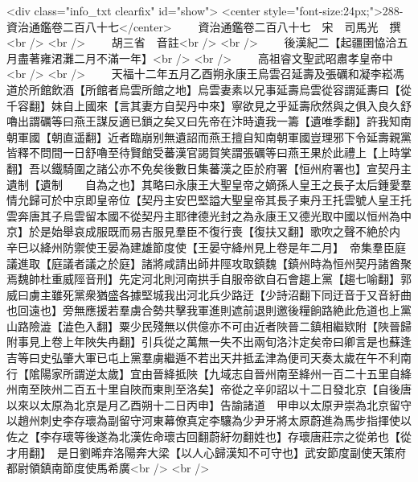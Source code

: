 <div class="info_txt clearfix" id="show">
<center style="font-size:24px;">288-資治通鑑卷二百八十七</center>
  　　資治通鑑卷二百八十七　宋　司馬光　撰<br />
<br />
　　胡三省　音註<br />
<br />
　　後漢紀二【起疆圉恊洽五月盡著雍涒灘二月不滿一年】<br />
<br />
　　高祖睿文聖武昭肅孝皇帝中<br />
<br />
　　天福十二年五月乙酉朔永康王烏雲召延壽及張礪和凝李崧馮道於所館飲酒【所館者烏雲所館之地】烏雲妻素以兄事延壽烏雲從容謂延夀曰【從千容翻】妹自上國來【言其妻方自契丹中來】寧欲見之乎延壽欣然與之俱入良久舒嚕出謂礪等曰燕王謀反適已鎖之矣又曰先帝在汴時遺我一籌【遺唯季翻】許我知南朝軍國【朝直遥翻】近者臨崩别無遺詔而燕王擅自知南朝軍國豈理邪下令延壽親黨皆釋不問間一日舒嚕至待賢館受蕃漢官謁賀笑謂張礪等曰燕王果於此禮上【上時掌翻】吾以鐵騎圍之諸公亦不免矣後數日集蕃漢之臣於府署【恒州府署也】宣契丹主遺制【遺制　　自為之也】其略曰永康王大聖皇帝之嫡孫人皇王之長子太后鍾愛羣情允歸可於中京即皇帝位【契丹主安巴堅謚大聖皇帝其長子東丹王托雲號人皇王托雲奔唐其子烏雲留本國不從契丹主耶律德光封之為永康王又德光取中國以恒州為中京】於是始舉哀成服既而易吉服見羣臣不復行喪【復扶又翻】歌吹之聲不絶於内　辛巳以絳州防禦使王晏為建雄節度使【王晏守絳州見上卷是年二月】　帝集羣臣庭議進取【庭議者議之於庭】諸將咸請出師井陘攻取鎮魏【鎮州時為恒州契丹諸酋聚焉魏帥杜重威陘音刑】先定河北則河南拱手自服帝欲自石會趨上黨【趨七喻翻】郭威曰虜主雖死黨衆猶盛各據堅城我出河北兵少路迂【少詩沼翻下同迂音于又音紆曲也回遠也】旁無應援若羣虜合勢共擊我軍進則遮前退則邀後糧餉路絶此危道也上黨山路險澁【澁色入翻】粟少民殘無以供億亦不可由近者陜晉二鎮相繼欵附【陜晉歸附事見上卷上年陜失冉翻】引兵從之萬無一失不出兩旬洛汴定矣帝曰卿言是也蘇逢吉等曰史弘肇大軍已屯上黨羣虜繼遁不若出天井抵孟津為便司天奏太歲在午不利南行【隂陽家所謂逆太歲】宜由晉絳抵陜【九域志自晉州南至絳州一百二十五里自絳州南至陜州二百五十里自陜而東則至洛矣】帝從之辛卯詔以十二日發北京【自後唐以來以太原為北京是月乙酉朔十二日丙申】告諭諸道　甲申以太原尹崇為北京留守以趙州刺史李存瓌為副留守河東幕僚真定李驤為少尹牙將太原蔚進為馬步指揮使以佐之【李存瓌等後遂為北漢佐命瓌古回翻蔚紆勿翻姓也】存瓌唐莊宗之從弟也【從才用翻】　是日劉晞弃洛陽奔大梁【以人心歸漢知不可守也】武安節度副使天策府都尉領鎮南節度使馬希廣<br />
<br />

